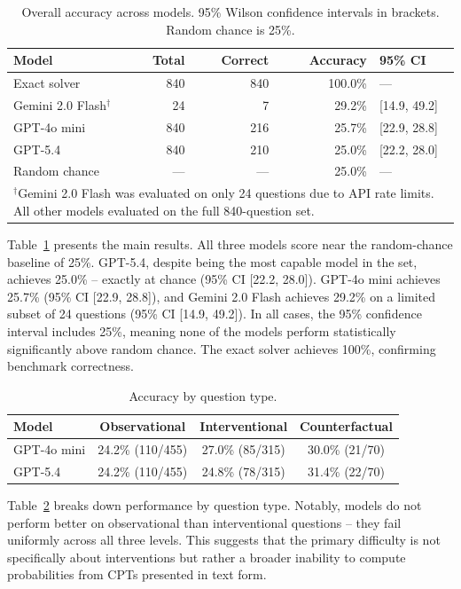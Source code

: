 \documentclass[11pt,a4paper]{article}
\begin{document}
\begin{table}[h]
\centering
\caption{Overall accuracy across models. 95\% Wilson confidence intervals in brackets. Random chance is 25\%.}
\label{tab:main}
\begin{tabular}{lrrrl}
\toprule
\textbf{Model} & \textbf{Total} & \textbf{Correct} & \textbf{Accuracy} & \textbf{95\% CI} \\
\midrule
Exact solver & 840 & 840 & 100.0\% & --- \\
\midrule
Gemini 2.0 Flash$^\dagger$ & 24 & 7 & 29.2\% & [14.9, 49.2] \\
GPT-4o mini & 840 & 216 & 25.7\% & [22.9, 28.8] \\
GPT-5.4 & 840 & 210 & 25.0\% & [22.2, 28.0] \\
\midrule
Random chance & --- & --- & 25.0\% & --- \\
\bottomrule
\multicolumn{5}{l}{\footnotesize $^\dagger$Gemini 2.0 Flash was evaluated on only 24 questions due to API rate limits. All other models evaluated on the full 840-question set.}
\end{tabular}
\end{table}

Table~\ref{tab:main} presents the main results. All three models score near the random-chance baseline of 25\%. GPT-5.4, despite being the most capable model in the set, achieves 25.0\% -- exactly at chance (95\% CI [22.2, 28.0]). GPT-4o mini achieves 25.7\% (95\% CI [22.9, 28.8]), and Gemini 2.0 Flash achieves 29.2\% on a limited subset of 24 questions (95\% CI [14.9, 49.2]). In all cases, the 95\% confidence interval includes 25\%, meaning none of the models perform statistically significantly above random chance. The exact solver achieves 100\%, confirming benchmark correctness.

\begin{table}[h]
\centering
\caption{Accuracy by question type.}
\label{tab:bykind}
\begin{tabular}{lccc}
\toprule
\textbf{Model} & \textbf{Observational} & \textbf{Interventional} & \textbf{Counterfactual} \\
\midrule
GPT-4o mini & 24.2\% (110/455) & 27.0\% (85/315) & 30.0\% (21/70) \\
GPT-5.4 & 24.2\% (110/455) & 24.8\% (78/315) & 31.4\% (22/70) \\
\bottomrule
\end{tabular}
\end{table}

Table~\ref{tab:bykind} breaks down performance by question type. Notably, models do not perform better on observational than interventional questions -- they fail uniformly across all three levels. This suggests that the primary difficulty is not specifically about interventions but rather a broader inability to compute probabilities from CPTs presented in text form.
\end{document}
